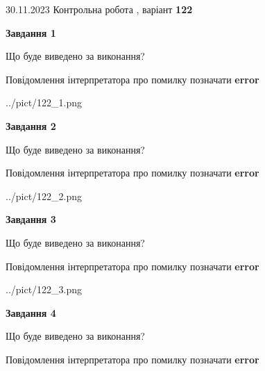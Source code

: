 \documentclass[12pt, ukrainian]{article}
\begin{document}
{{30.11.2023 Контрольна робота , варіант  \No \textbf { 122 }\par}}
{




{\begin {center}\textbf{Завдання 1}\end {center}}\par
Що буде виведено за виконання? \par
Повідомлення інтерпретатора про помилку позначати \textbf{error}

\begin{center}
	{../pict/122_1.png}
\end{center}
\newpage

{\begin {center}\textbf{Завдання 2}\end {center}}\par
Що буде виведено за виконання? \par
Повідомлення інтерпретатора про помилку позначати \textbf{error}

\begin{center}
	{../pict/122_2.png}
\end{center}
\newpage

{\begin {center}\textbf{Завдання 3}\end {center}}\par
Що буде виведено за виконання? \par
Повідомлення інтерпретатора про помилку позначати \textbf{error}

\begin{center}
	{../pict/122_3.png}
\end{center}
\newpage

{\begin {center}\textbf{Завдання 4}\end {center}}\par
Що буде виведено за виконання? \par
Повідомлення інтерпретатора про помилку позначати \textbf{error}

}
\end{document}
